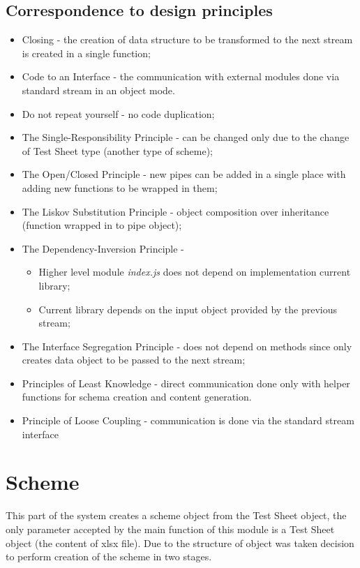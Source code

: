 \subsection{Correspondence to design principles}
\begin{itemize}
	\item Closing - the creation of data structure to be transformed to the next stream is created in a single function;
	\item Code to an Interface - the communication with external modules done via standard stream in an object mode. 
	\item Do not repeat yourself - no code duplication;
	\item The Single-Responsibility Principle - can be changed only due to the change of Test Sheet type (another type of scheme);
	\item The Open/Closed Principle - new pipes can be added in a single place with adding new functions to be wrapped in them;
	\item The Liskov Substitution Principle - object composition over inheritance (function wrapped in to pipe object);
	\item The Dependency-Inversion Principle - 
				\begin{itemize}
					\item Higher level module \textit{index.js} does not depend on implementation current library;
					\item Current library depends on the input object provided by the previous stream;
				\end{itemize}
	\item The Interface Segregation Principle -  does not depend on methods since only creates data object to be passed to the next stream;
	\item Principles of Least Knowledge - direct communication done only with helper functions for schema creation and content generation. 
	\item Principle of Loose Coupling - communication is done via the standard stream interface
\end{itemize}


\section{Scheme}
\label{sec:scheme}
This part of the system creates a scheme object from the Test Sheet object, the only parameter accepted by the main function of this module is a Test Sheet object (the content of xlsx file). Due to the structure of object was taken decision to perform creation of the scheme in two stages.

